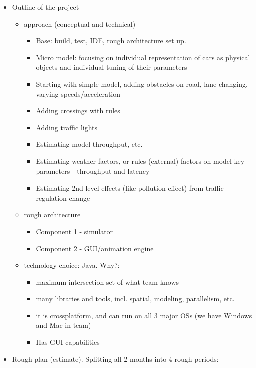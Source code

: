\begin{itemize}
	\item Outline of the project
	\begin{itemize}
		\item approach (conceptual and technical)
		\begin{itemize}
		    \item Base: build, test, IDE, rough architecture set up.
		    \item Micro model: focusing on individual representation of cars as physical objects and individual tuning of their parameters
		    \item Starting with simple model, adding obstacles on road, lane changing, varying speeds/acceleration
		    \item Adding crossings with rules
		    \item Adding traffic lights
		    \item Estimating model throughput, etc.
		    \item Estimating weather factors, or rules (external) factors on model key parameters - throughput and latency
		    \item Estimating 2nd level effects (like pollution effect) from traffic regulation change
		\end{itemize}

		\item rough architecture
		\begin{itemize}
		    \item Component 1 - simulator
		    \item Component 2 - GUI/animation engine
		\end{itemize}

		\item technology choice: Java. Why?:
		\begin{itemize}
		    \item maximum intersection set of what team knows
		    \item many libraries and tools, incl. spatial, modeling, parallelism, etc.
		    \item it is crossplatform, and can run on all 3 major OSs (we have Windows and Mac in team)
		    \item Has GUI capabilities
		\end{itemize}

	\end{itemize}

	\item Rough plan (estimate). Splitting all 2 months into 4 rough periods:
	\begin{itemize}


\end{itemize}
\end{itemize}
